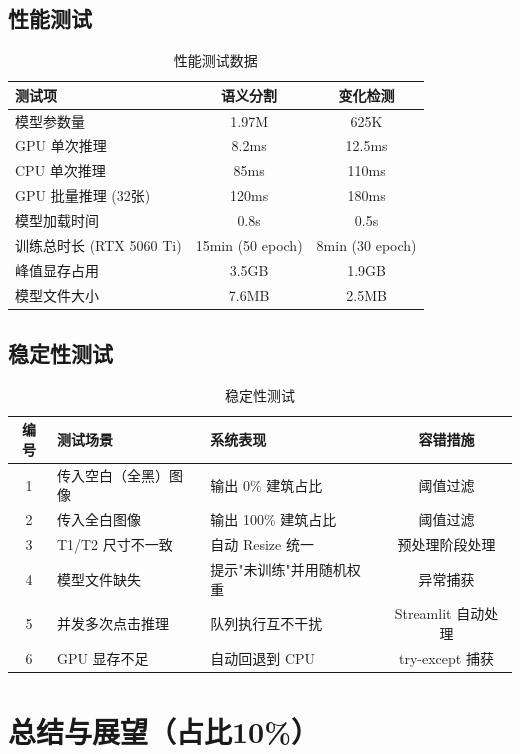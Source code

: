 \documentclass[12pt,a4paper]{article}
\begin{document}
\subsection{性能测试}

\begin{table}[H]
\centering
\caption{性能测试数据}
\label{tab:pt}
\begin{tabular}{lcc}
\toprule
测试项 & 语义分割 & 变化检测 \\
\midrule
模型参数量 & 1.97M & 625K \\
GPU 单次推理 & 8.2ms & 12.5ms \\
CPU 单次推理 & 85ms & 110ms \\
GPU 批量推理 (32张) & 120ms & 180ms \\
模型加载时间 & 0.8s & 0.5s \\
训练总时长 (RTX 5060 Ti) & 15min (50 epoch) & 8min (30 epoch) \\
峰值显存占用 & 3.5GB & 1.9GB \\
模型文件大小 & 7.6MB & 2.5MB \\
\bottomrule
\end{tabular}
\end{table}

\subsection{稳定性测试}

\begin{table}[H]
\centering
\caption{稳定性测试}
\label{tab:st}
\begin{tabular}{cllc}
\toprule
编号 & 测试场景 & 系统表现 & 容错措施 \\
\midrule
1 & 传入空白（全黑）图像 & 输出 0\% 建筑占比 & 阈值过滤 \\
2 & 传入全白图像 & 输出 100\% 建筑占比 & 阈值过滤 \\
3 & T1/T2 尺寸不一致 & 自动 Resize 统一 & 预处理阶段处理 \\
4 & 模型文件缺失 & 提示"未训练"并用随机权重 & 异常捕获 \\
5 & 并发多次点击推理 & 队列执行互不干扰 & Streamlit 自动处理 \\
6 & GPU 显存不足 & 自动回退到 CPU & try-except 捕获 \\
\bottomrule
\end{tabular}
\end{table}

\section{总结与展望（占比10\%）}
\end{document}
